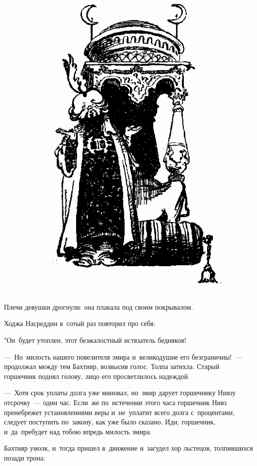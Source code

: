 \documentclass[12pt,a4paper]{book}
\begin{document}
\begin{figure}[h]
\centering
\includegraphics[scale=0.62]{8.png}
\end{figure}

Плечи девушки дрогнули: она плакала под своим покрывалом.

Ходжа Насреддин в~сотый раз повторил про себя:

"Он~будет утоплен, этот безжалостный истязатель бедняков!

—~Но~милость нашего повелителя эмира и~великодушие его безграничны!~— продолжал между тем Бахтияр, возвысив голос. Толпа затихла. Старый горшечник поднял голову, лицо его просветлилось надеждой.

—~Хотя срок уплаты долга уже миновал, но~эмир дарует горшечнику Ниязу отсрочку~— один час. Если~же по~истечении этого часа горшечник Нияз пренебрежет установлениями веры и~не~уплатит всего долга с~процентами, следует поступить по~закону, как уже было сказано. Иди, горшечник, и~да~пребудет над тобою впредь милость эмира.

Бахтияр умолк, и~тогда пришел в~движение и~загудел хор льстецов, толпившихся позади трона:
\end{document}
